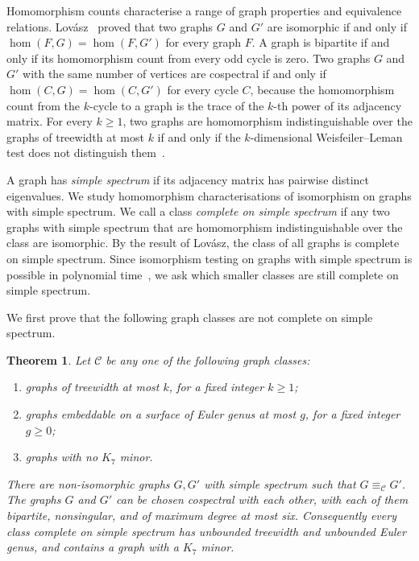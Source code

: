 \documentclass[11pt,a4paper]{article}
\theoremstyle{plain}
\newtheorem{theorem}{Theorem}
\theoremstyle{definition}
\begin{document}
Homomorphism counts characterise a range of graph properties and
equivalence relations. Lov\'asz~\cite{Lovasz1967} proved that two graphs
$G$ and $G'$ are isomorphic if and only if $\hom(F,G)=\hom(F,G')$ for every
graph $F$.
A graph is bipartite if and only if its homomorphism count from every odd
cycle is zero. Two graphs $G$ and $G'$ with the same number of vertices
are cospectral if and only if $\hom(C,G)=\hom(C,G')$ for every cycle $C$,
because the homomorphism count from the $k$-cycle to a graph is the trace
of the $k$-th power of its adjacency matrix. For every $k\geq1$, two graphs are
homomorphism indistinguishable over the graphs of treewidth at most $k$ if
and only if the $k$-dimensional Weisfeiler--Leman test does not distinguish
them~\cite{Dvorak2010,DellGroheRattan2018}.

A graph has \emph{simple spectrum} if its adjacency matrix has pairwise
distinct eigenvalues. We study homomorphism characterisations of
isomorphism on graphs with simple spectrum.
We call a class \emph{complete on simple spectrum} if any two graphs with
simple spectrum that are homomorphism indistinguishable over the class
are isomorphic.
By the result of Lov\'asz, the class of all graphs is complete on simple
spectrum. Since isomorphism testing on graphs with simple spectrum is
possible in polynomial time~\cite{BabaiGrigoryevMount1982}, we ask which
smaller classes are still complete on simple spectrum.

We first prove that the following graph classes are not complete on
simple spectrum.

\begin{theorem}\label{thm:incompleteness}
Let $\mathcal C$ be any one of the following graph classes:
\begin{enumerate}
 \item graphs of treewidth at most $k$, for a fixed integer $k\geq1$;
 \item graphs embeddable on a surface of Euler genus at most $g$, for a fixed integer $g\geq0$;
 \item graphs with no $K_7$ minor.
\end{enumerate}
There are non-isomorphic graphs $G,G'$ with simple spectrum such that
$G\equiv_{\mathcal C}G'$.
The graphs $G$ and $G'$ can be chosen cospectral with each other, with
each of them bipartite, nonsingular, and of maximum degree at most six.
Consequently every class complete on simple spectrum has unbounded treewidth
and unbounded Euler genus, and contains a graph with a $K_7$ minor.
\end{theorem}
\end{document}

